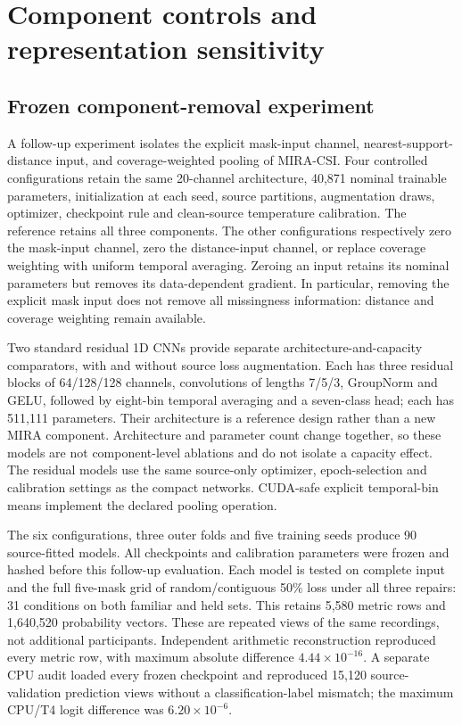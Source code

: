 \section{Component controls and representation sensitivity}\label{sec:components}
\subsection{Frozen component-removal experiment}
A follow-up experiment isolates the explicit mask-input channel, nearest-support-distance input, and coverage-weighted pooling of MIRA-CSI. Four controlled configurations retain the same 20-channel architecture, 40,871 nominal trainable parameters, initialization at each seed, source partitions, augmentation draws, optimizer, checkpoint rule and clean-source temperature calibration. The reference retains all three components. The other configurations respectively zero the mask-input channel, zero the distance-input channel, or replace coverage weighting with uniform temporal averaging. Zeroing an input retains its nominal parameters but removes its data-dependent gradient. In particular, removing the explicit mask input does not remove all missingness information: distance and coverage weighting remain available.

Two standard residual 1D CNNs provide separate architecture-and-capacity comparators, with and without source loss augmentation. Each has three residual blocks of 64/128/128 channels, convolutions of lengths 7/5/3, GroupNorm and GELU, followed by eight-bin temporal averaging and a seven-class head; each has 511,111 parameters. Their architecture is a reference design rather than a new MIRA component. Architecture and parameter count change together, so these models are not component-level ablations and do not isolate a capacity effect. The residual models use the same source-only optimizer, epoch-selection and calibration settings as the compact networks. CUDA-safe explicit temporal-bin means implement the declared pooling operation.

The six configurations, three outer folds and five training seeds produce 90 source-fitted models. All checkpoints and calibration parameters were frozen and hashed before this follow-up evaluation. Each model is tested on complete input and the full five-mask grid of random/contiguous 50\% loss under all three repairs: 31 conditions on both familiar and held sets. This retains 5,580 metric rows and 1,640,520 probability vectors. These are repeated views of the same recordings, not additional participants. Independent arithmetic reconstruction reproduced every metric row, with maximum absolute difference $4.44\times10^{-16}$. A separate CPU audit loaded every frozen checkpoint and reproduced 15,120 source-validation prediction views without a classification-label mismatch; the maximum CPU/T4 logit difference was $6.20\times10^{-6}$.

